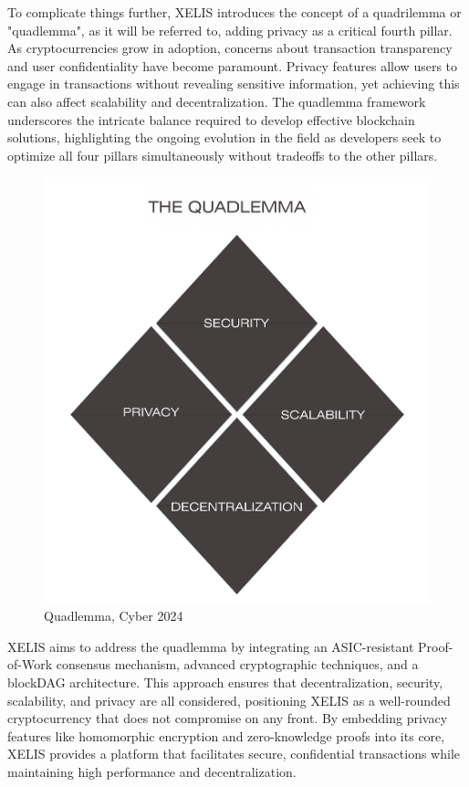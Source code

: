 \documentclass[10pt,a4paper,twocolumn]{article}
\begin{document}
To complicate things further, XELIS introduces the concept of a quadrilemma or "quadlemma", as it will be referred to, adding privacy as a critical fourth pillar. As cryptocurrencies grow in adoption, concerns about transaction transparency and user confidentiality have become paramount. Privacy features allow users to engage in transactions without revealing sensitive information, yet achieving this can also affect scalability and decentralization. The quadlemma framework underscores the intricate balance required to develop effective blockchain solutions, highlighting the ongoing evolution in the field as developers seek to optimize all four pillars simultaneously without tradeoffs to the other pillars. \\




\begin{figure}
    \centering
    \includegraphics[width=1\linewidth]{Frame 9.png}
    \caption{Quadlemma, Cyber 2024}
\end{figure}

XELIS aims to address the quadlemma by integrating an ASIC-resistant Proof-of-Work consensus mechanism, advanced cryptographic techniques, and a blockDAG architecture. This approach ensures that decentralization, security, scalability, and privacy are all considered, positioning XELIS as a well-rounded cryptocurrency that does not compromise on any front. By embedding privacy features like homomorphic encryption and zero-knowledge proofs into its core, XELIS provides a platform that facilitates secure, confidential transactions while maintaining high performance and decentralization.\\
\end{document}
